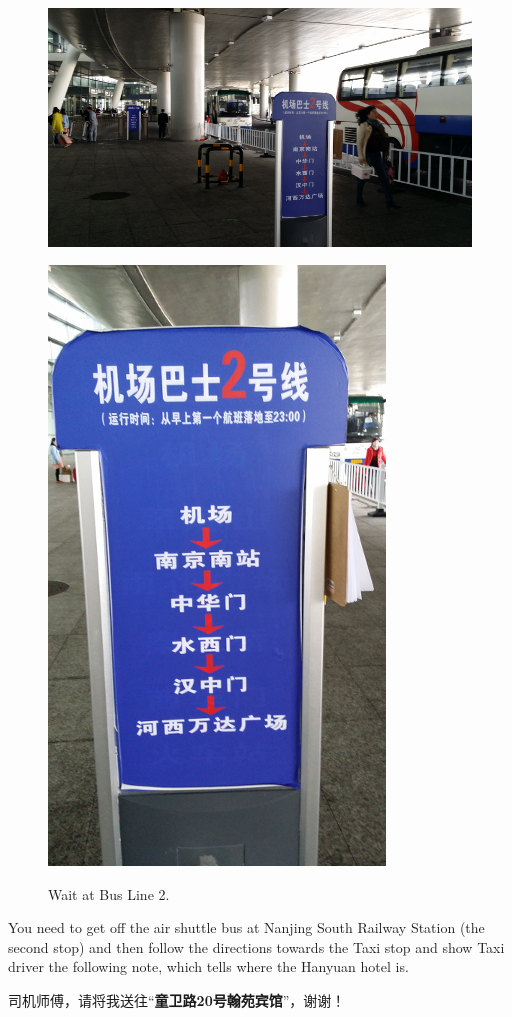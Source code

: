\documentclass[11pt]{article}
\begin{document}
 \begin{figure}[!h]
	\begin{minipage}[t]{.5\textwidth}
     	\centering
   	 	\includegraphics[scale=0.27]{20150331_104050.jpg}
	\end{minipage}%
     \begin{minipage}[t]{.5\textwidth}
         \centering
       	 \includegraphics[scale=0.27]{20150331_104141.jpg} \\
    \end{minipage}%
    \caption{Wait at Bus Line 2.\label{20150331_104050}}
 \end{figure}
You need to get off the air shuttle bus at Nanjing South Railway Station (the second stop) and then
follow the directions towards the Taxi stop and show Taxi driver the following note, which tells where the Hanyuan hotel is.
\begin{center}
	 司机师傅，请将我送往``{\bf 童卫路20号翰苑宾馆}''，谢谢！
\end{center}
\end{document}
